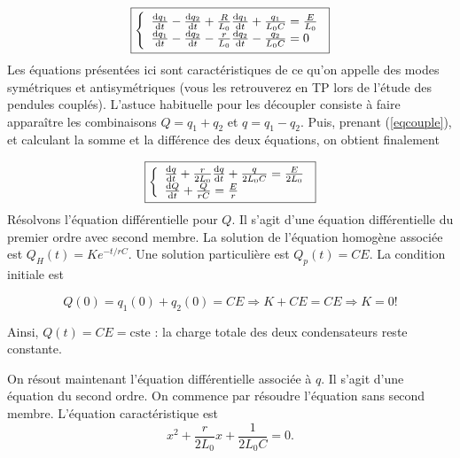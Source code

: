 \begin{solution}
\begin{questions}
                \begin{equation}
                \label{eqcouple}
                \boxed{
                \left\{\begin{array}{ll}
                \dv{ q_1}{t}-\dv{ q_2}{t}+\frac{R}{L_0}\dv{q_1}{t}+\frac{q_1}{L_0 C} = \frac{E}{L_0}\\
                \dv{q_1}{t}-\dv{ q_2}{t}-\frac{r}{L_0}\dv{q_2}{t}-\frac{q_2}{L_0 C} = 0 \\
                \end{array}\right.}
                \end{equation}
    \question  Les équations présentées ici sont caractéristiques de ce qu'on appelle des modes symétriques et antisymétriques (vous les retrouverez en TP lors de l'étude des pendules couplés). L'astuce habituelle pour les découpler consiste à faire apparaître les combinaisons $Q=q_1+q_2$ et $q=q_1-q_2$. Puis, prenant (\ref{eqcouple}), et calculant la somme et la différence des deux équations, on obtient finalement

                \begin{equation}
                \boxed{ \left\{\begin{array}{ll}
                    \dv{q}{t}+\frac{r}{2L_0}\dv{q}{t}+\frac{q}{2L_0 C} = \frac{E}{2L_0} \\
                    \dv{Q}{t}+\frac{Q}{rC} = \frac{E}{r} 
                \end{array}\right.}
                \end{equation}
    \question Résolvons l'équation différentielle pour $Q$. Il s'agit d'une équation différentielle du premier ordre avec second membre. La solution de l'équation homogène associée est $Q_H(t) = Ke^{-t/rC}$. Une solution particulière est $Q_p(t) = CE$. La condition initiale est 

                \begin{equation}
                Q(0) = q_1(0)+q_2(0) = CE \Rightarrow K+CE = CE \Rightarrow K=0 !
                \end{equation}

                Ainsi, $\boxed{Q(t)=CE=\text{cste}}$ : la charge totale des deux condensateurs reste constante.

                On résout maintenant l'équation différentielle associée à $q$. Il s'agit d'une équation du second ordre. On commence par résoudre l'équation sans second membre. L'équation caractéristique est
                \[x^2+\frac{r}{2L_0}x+\frac{1}{2L_0C}=0.\]


\end{questions}
\end{solution}
